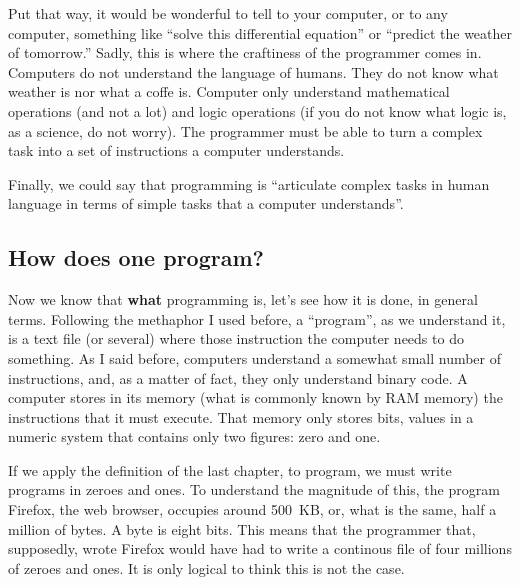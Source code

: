 \documentclass[a4paper]{article}
\begin{document}
Put that way, it would be wonderful to tell to your computer, or to any
computer, something like ``solve this differential equation'' or ``predict the
weather of tomorrow.'' Sadly, this is where the craftiness of the programmer
comes in. Computers do not understand the language of humans. They do not know
what weather is nor what a coffe is. Computer only understand mathematical
operations (and not a lot) and logic operations (if you do not know what logic
is, as a science, do not worry). The programmer must be able to turn a complex
task into a set of instructions a computer understands.


Finally, we could say that programming is ``articulate complex tasks in human
language in terms of simple tasks that a computer understands''.

\subsection{How does one program?}
Now we know that \textbf{what} programming is, let's see how it is done, in
general terms. Following the methaphor I used before, a ``program'', as we
understand it, is a text file (or several) where those instruction the computer
needs to do something. As I said before, computers understand a somewhat small
number of instructions, and, as a matter of fact, they only understand binary
code. A computer stores in its memory (what is commonly known by RAM memory)
the instructions that it must execute. That memory only stores bits, values
in a numeric system that contains only two figures: zero and one.

If we apply the definition of the last chapter, to program, we must write
programs in zeroes and ones. To understand the magnitude of this, the program
Firefox, the web browser, occupies around 500~KB, or, what is the same, half a
million of bytes. A byte is eight bits. This means that the programmer that,
supposedly, wrote Firefox would have had to write a continous file of four
millions of zeroes and ones. It is only logical to think this is not the case.
\end{document}
